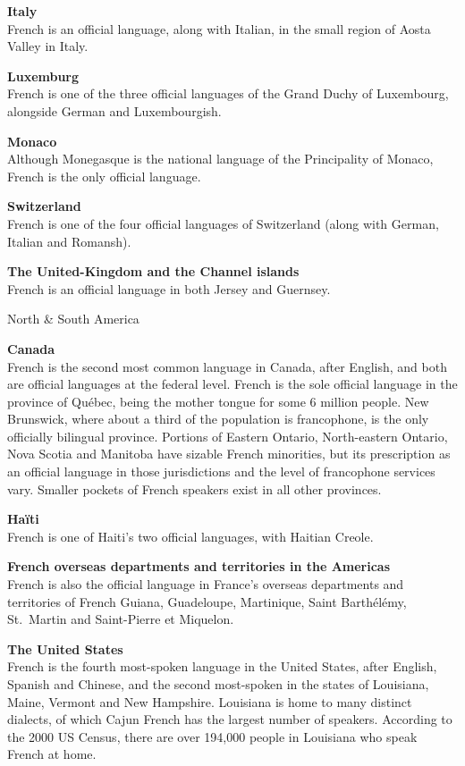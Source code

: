 \begin{multicols}{2}
{\bf Italy}\\
French is an official language, along with Italian, in the small region of Aosta Valley in Italy.

{\bf Luxemburg}\\
French is one of the three official languages of the Grand Duchy of Luxembourg, alongside German and Luxembourgish.

{\bf Monaco}\\ 
Although Monegasque is the national language of the Principality of
Monaco, French is the only official language.

{\bf Switzerland}\\
French is one of the four official languages of Switzerland (along with German, Italian and Romansh).

{\bf The United-Kingdom and the Channel islands}\\
French is an official language in both Jersey and Guernsey.

\begin{center}
{\sc North \& South America}
\end{center}

{\bf Canada}\\
French is the second most common language in Canada, after English,
and both are official languages at the federal level. French is the
sole official language in the province of Québec, being the mother
tongue for some 6 million people. New Brunswick, where about a third
of the population is francophone, is the only officially bilingual
province. Portions of Eastern Ontario, North-eastern Ontario, Nova
Scotia and Manitoba have sizable French minorities, but its
prescription as an official language in those jurisdictions and the
level of francophone services vary. Smaller pockets of French speakers
exist in all other provinces.

{\bf Haïti}\\
French is one of Haiti's two official languages, with Haitian Creole. 

{\bf French overseas departments and territories in the Americas}\\
French is also the official language in France's overseas departments and territories of French Guiana, Guadeloupe, Martinique, Saint Barthélémy, St.~Martin and Saint-Pierre et Miquelon.

{\bf The United States }\\
French is the fourth most-spoken language in the United States, after
English, Spanish and Chinese, and the second most-spoken in the states
of Louisiana, Maine, Vermont and New Hampshire. Louisiana is home to
many distinct dialects, of which Cajun French has the largest number
of speakers. According to the 2000 US Census, there are over 194,000
people in Louisiana who speak French at home.


\end{multicols}
